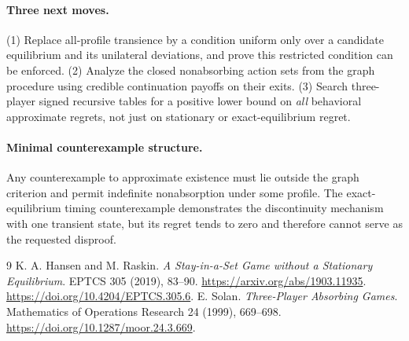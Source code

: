 \documentclass[11pt,a4paper]{article}
\theoremstyle{definition}
\theoremstyle{remark}
\begin{document}
\paragraph{Three next moves.}
(1) Replace all-profile transience by a condition uniform only over a candidate equilibrium and its unilateral deviations, and prove this restricted condition can be enforced. (2) Analyze the closed nonabsorbing action sets from the graph procedure using credible continuation payoffs on their exits. (3) Search three-player signed recursive tables for a positive lower bound on \emph{all} behavioral approximate regrets, not just on stationary or exact-equilibrium regret.

\paragraph{Minimal counterexample structure.}
Any counterexample to approximate existence must lie outside the graph criterion and permit indefinite nonabsorption under some profile. The exact-equilibrium timing counterexample demonstrates the discontinuity mechanism with one transient state, but its regret tends to zero and therefore cannot serve as the requested disproof.

\begin{thebibliography}{9}
 K. A. Hansen and M. Raskin. \emph{A Stay-in-a-Set Game without a Stationary Equilibrium}. EPTCS 305 (2019), 83--90. \url{https://arxiv.org/abs/1903.11935}. \url{https://doi.org/10.4204/EPTCS.305.6}.
 E. Solan. \emph{Three-Player Absorbing Games}. Mathematics of Operations Research 24 (1999), 669--698. \url{https://doi.org/10.1287/moor.24.3.669}.
\end{thebibliography}
\end{document}
